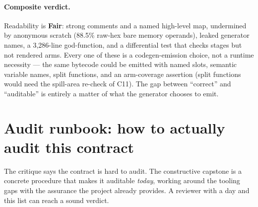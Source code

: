 \paragraph{Composite verdict.}
Readability is \textbf{Fair}: strong comments and a named
high-level map, undermined by anonymous scratch (88.5\% raw-hex
bare memory operands), leaked generator names, a 3{,}286-line
god-function, and a differential test that checks stages but not
rendered arms. Every one of these is a codegen-emission choice, not a
runtime necessity --- the same bytecode could be emitted with
named slots, semantic variable names, split functions, and an
arm-coverage assertion (split functions would need the spill-area
re-check of C11). The gap between ``correct'' and
``auditable'' is entirely a matter of what the generator chooses
to emit.

\section{Audit runbook: how to actually audit this contract}
\label{sec:c-runbook}

The critique says the contract is hard to audit. The constructive
capstone is a concrete procedure that makes it auditable
\emph{today}, working around the tooling gaps with the
assurance the project already provides. A reviewer with a day
and this list can reach a sound verdict.

